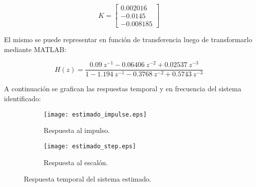 \vspace{-0.75cm}
\begin{equation}
    K = \begin{bmatrix}
        0.002016 \\
        -0.0145   \\
        -0.008185
    \end{bmatrix}
\end{equation}

El mismo se puede representar en función de transferencia luego de transformarlo mediante MATLAB:

\vspace{-0.5cm}
\begin{equation}
    H(z) = \dfrac{0.09\ z^{-1} - 0.06406\ z^{-2} + 0.02537\ z^{-3}}{1 - 1.194\ z^{-1} - 0.3768\ z^{-2} + 0.5743\ z^{-3}}
\end{equation}
\vspace{-0.5cm}

A continuación se grafican las respuestas temporal y en frecuencia del sistema identificado:

\begin{figure}[H]
    \centering

    \begin{subfigure}[b]{0.49\textwidth}
        \centering
        \texttt{[image: estimado\_impulse.eps]}
        \caption{Respuesta al impulso.}
        \label{fig:estimado_impulse}
    \end{subfigure}
    \begin{subfigure}[b]{0.49\textwidth}
        \centering
        \texttt{[image: estimado\_step.eps]}
        \caption{Respuesta al escalón.}
        \label{fig:estimado_step}
    \end{subfigure}

    \vspace{-0.25cm}
    \caption{Respuesta temporal del sistema estimado.}
    \label{fig:estimado_temporal}
\end{figure}
\vspace{-0.5cm}

